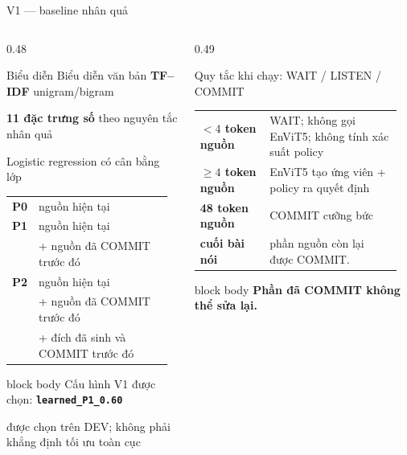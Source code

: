 \documentclass[aspectratio=169,11pt]{beamer}
\begin{document}
\begin{frame}{V1 --- baseline nhân quả}
  \begin{columns}[T,onlytextwidth]
    \begin{column}{0.48\textwidth}
      \begin{block}{Biểu diễn}
        \scriptsize
        Biểu diễn văn bản \textbf{TF--IDF} unigram/bigram\par
        \vspace{0.2em}
        \textbf{11 đặc trưng số} theo nguyên tắc nhân quả\par
        \vspace{0.2em}
        Logistic regression có cân bằng lớp
      \end{block}
      \vspace{0.25em}
      \scriptsize
      \begin{tabular}{@{}>{\bfseries}p{0.10\linewidth}p{0.84\linewidth}@{}}
        P0 & nguồn hiện tại \\[0.25em]
        P1 & nguồn hiện tại\\
           & + nguồn đã COMMIT trước đó \\[0.25em]
        P2 & nguồn hiện tại\\
           & + nguồn đã COMMIT trước đó\\
           & + đích đã sinh và COMMIT trước đó
      \end{tabular}
      \vspace{0.5em}
      \begin{beamercolorbox}[rounded=true,sep=0.45em,center]{block body}
        Cấu hình V1 được chọn: \textbf{\texttt{learned\_P1\_0.60}}\par
        \scriptsize được chọn trên DEV; không phải khẳng định tối ưu toàn cục
      \end{beamercolorbox}
    \end{column}
    \begin{column}{0.49\textwidth}
      \begin{block}{Quy tắc khi chạy: WAIT / LISTEN / COMMIT}
        \scriptsize
        \begin{tabular}{@{}>{\bfseries}p{0.32\linewidth}p{0.61\linewidth}@{}}
          $<4$ token nguồn & WAIT; không gọi EnViT5; không tính xác suất policy \\[0.45em]
          $\geq4$ token nguồn & EnViT5 tạo ứng viên + policy ra quyết định \\[0.45em]
          48 token nguồn & COMMIT cưỡng bức \\[0.45em]
          cuối bài nói & phần nguồn còn lại được COMMIT.
        \end{tabular}
      \end{block}
      \vspace{0.55em}
      \begin{beamercolorbox}[rounded=true,sep=0.55em,center]{block body}
        \textbf{Phần đã COMMIT không thể sửa lại.}
      \end{beamercolorbox}
    \end{column}
  \end{columns}
\end{frame}
\end{document}
